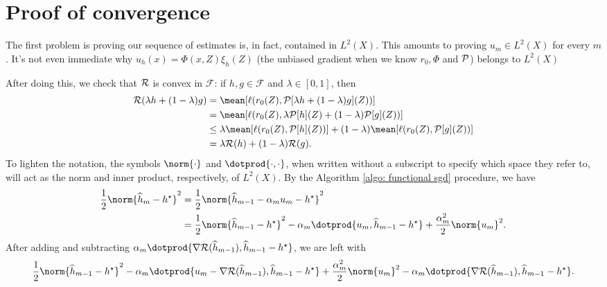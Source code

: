 \section{Proof of convergence}

The first problem is proving our sequence of estimates is, in fact, contained in $ L^{ 2 } ( X ) $.
This amounts to proving $ u_{ m } \in L^{ 2 } ( X ) $ for every $ m $.
It's not even immediate why $ u_{ h } ( x ) = \Phi ( x, Z ) \xi_{ h } ( Z ) $ (the unbiased gradient when we know $ r_{ 0 }, \Phi $ and $ \mathcal{P} $) belongs to $ L^{ 2 } ( X ) $

After doing this, we check that $ \mathcal{R} $ is convex in $ \mathcal{F} $:
if $ h, g \in \mathcal{F} $ and $ \lambda \in [ 0, 1 ] $, then
\begin{align*}
    \risk ( \lambda h + ( 1 - \lambda ) g )
    &= \mean [ \loss ( r_{ 0 } ( Z ), \meanop [ \lambda h + ( 1 - \lambda ) g ] ( Z ) ) ] \\
    &= \mean [ \loss ( r_{ 0 } ( Z ), \lambda \meanop [ h ] ( Z ) + ( 1 - \lambda ) \meanop [ g ] ( Z ) ) ] \\
    &\leq \lambda \mean [ \loss ( r_{ 0 } ( Z ), \meanop [ h ] ( Z ) ) ] + ( 1 - \lambda ) \mean [ \loss ( r_{ 0 } ( Z ), \meanop [ g ] ( Z ) ) ] \\
    &= \lambda \risk ( h ) + ( 1 - \lambda ) \risk ( g )
.\end{align*}
To lighten the notation, the symbols $ \norm{ \cdot } $ and $ \dotprod{ \cdot, \cdot } $, when written without a subscript to specify which space they refer to, will act as the norm and inner product, respectively, of $ L^2 ( X ) $.
By the Algorithm \ref{algo: functional sgd} procedure, we have
\begin{align*}
    \frac{ 1 }{ 2 } \norm{ \hat{ h }_{ m } - \hstar }^2
    &= \frac{ 1 }{ 2 } \norm{ \hat{ h }_{ m-1 } - \alpha_{ m } u_{ m } - \hstar }^2 \\
    &= \frac{ 1 }{ 2 } \norm{ \hat{ h }_{ m-1 } - \hstar }^2
    - \alpha_{ m } \dotprod{ u_{ m }, \hat{ h }_{ m-1 } - \hstar }
    + \frac{ \alpha_{ m }^2 }{ 2 } \norm{ u_{ m } }^2
.\end{align*}
After adding and subtracting $ \alpha_{ m } \dotprod{ \nabla \risk ( \hat{ h }_{ m-1 } ), \hat{ h }_{ m-1 } - \hstar } $, we are left with
\begin{equation*}
    \frac{ 1 }{ 2 } \norm{ \hat{ h }_{ m-1 } - \hstar }^2
    - \alpha_{ m } \dotprod{ u_{ m } - \nabla \risk ( \hat{ h }_{ m-1 } ), \hat{ h }_{ m-1 } - \hstar }
    + \frac{ \alpha_{ m }^2 }{ 2 } \norm{ u_{ m } }^2
    - \alpha_{ m } \dotprod{ \nabla \risk ( \hat{ h }_{ m-1 } ), \hat{ h }_{ m-1 } - \hstar }
.\end{equation*}
